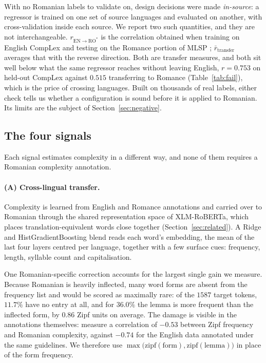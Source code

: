 With no Romanian labels to validate on, design decisions were made
\emph{in-source}: a regressor is trained on one set of source languages
and evaluated on another, with cross-validation inside each source. We
report two such quantities, and they are not interchangeable.
$r_{\mathrm{EN}\rightarrow\mathrm{RO}^{*}}$ is the correlation obtained
when training on English CompLex \citep{shardlow-etal-2021-semeval} and
testing on the Romance portion of MLSP \citep{shardlow-etal-2024-bea};
$\bar{r}_{\mathrm{transfer}}$ averages that with the reverse direction.
Both are transfer measures, and both sit well below what the same
regressor reaches without leaving English, $r = 0.753$ on held-out
CompLex against $0.515$ transferring to Romance
(Table~\ref{tab:fail}), which is the price of crossing languages. Built
on thousands of real labels, either check tells us whether a
configuration is sound before it is applied to Romanian. Its limits are
the subject of Section~\ref{sec:negative}.

\subsection{The four signals}

Each signal estimates complexity in a different way, and none of them
requires a Romanian complexity annotation.

\paragraph{(A) Cross-lingual transfer.}
Complexity is learned from English and Romance annotations
\citep{shardlow-etal-2021-semeval, shardlow-etal-2024-bea} and carried
over to Romanian through the shared representation space of
XLM-RoBERTa, which places translation-equivalent words close together
(Section~\ref{sec:related}). A Ridge and HistGradientBoosting blend
reads each word's embedding, the mean of the last four layers centred
per language, together with a few surface cues: frequency, length,
syllable count and capitalisation.

One Romanian-specific correction accounts for the largest single gain we
measure. Because Romanian is heavily inflected, many word forms are
absent from the frequency list and would be scored as maximally rare: of
the $1587$ target tokens, $11.7\%$ have no entry at all, and for
$36.0\%$ the lemma is more frequent than the inflected form, by $0.86$
Zipf units on average. The damage is visible in the annotations
themselves: \citet{anghel-etal-2025-rals} measure a correlation of
$-0.53$ between Zipf frequency and Romanian complexity, against $-0.74$
for the English data annotated under the same guidelines. We therefore
use
$\max\bigl(\mathrm{zipf}(\mathrm{form}), \mathrm{zipf}(\mathrm{lemma})\bigr)$
in place of the form frequency.

